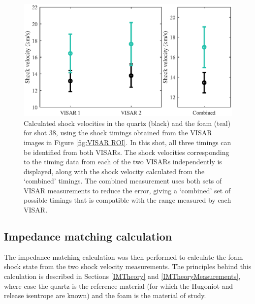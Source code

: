 \begin{figure} [h]
\begin{centering}
\includegraphics[width=1.0\textwidth]{figures/Experiment/VISARTiming.eps}%
\caption{\label{fig:VISAR Timing} Calculated shock velocities in the quartz (black) and the foam (teal)  for shot 38, using the shock timings obtained from the VISAR images in Figure \ref{fig:VISAR ROI}. In this shot, all three timings can be identified from both VISARs. The shock velocities corresponding to the timing data from each of the two VISARs independently is displayed, along with the shock velocity calculated from the `combined' timings. The combined measurement uses both sets of VISAR measurements to reduce the error, giving a `combined' set of possible timings that is compatible with the range measured by each VISAR.}
\end{centering}
\end{figure}



\subsection{Impedance matching calculation} \label{IM calc}
The impedance matching calculation was then performed to calculate the foam shock state from the two shock velocity measurements. The principles behind this calculation is described in Sections \ref{IMTheory} and \ref{IMTheoryMeasurements}, where case the quartz is the reference material (for which the Hugoniot and release isentrope are known) and the foam is the material of study.

